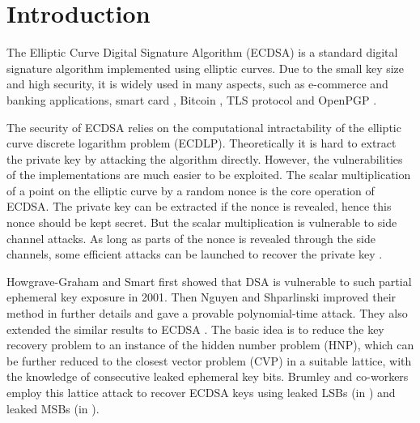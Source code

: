 
\section{Introduction}
\label{sec:intro}
The Elliptic Curve Digital Signature Algorithm (ECDSA) \cite{Johnson2001, ansi2005} is a standard digital signature algorithm implemented using elliptic curves.
Due to the small key size and high security, it is widely used in many aspects, such as e-commerce and banking applications, smart card \cite{smartcard2007}, Bitcoin \cite{bitcoin2008}, TLS protocol \cite{rfc5246} and OpenPGP \cite{openpgp2007}.

The security of ECDSA relies on the computational intractability of the elliptic curve discrete logarithm problem (ECDLP).
Theoretically it is hard to extract the private key by attacking the algorithm directly.
However, the vulnerabilities of the implementations are much easier to be exploited.
The scalar multiplication of a point on the elliptic curve by a random nonce is the core operation of ECDSA.
The private key can be extracted if the nonce is revealed,
hence this nonce should be kept secret.
But the scalar multiplication is vulnerable to side channel attacks.
As long as parts of the nonce is revealed through the side channels,
 some efficient attacks can be launched to recover the private key \cite{Nguyen2001,HG2001,Nguyen2002,Nguyen2003}.

Howgrave-Graham and Smart \cite{HG2001} first showed that DSA is vulnerable to such partial ephemeral key exposure in 2001.
Then Nguyen and Shparlinski \cite{Nguyen2002} improved their method in further details and gave a provable polynomial-time attack.
They also extended the similar results to ECDSA \cite{Nguyen2003}.
The basic idea is to reduce the key recovery problem to an instance of the hidden number problem
(HNP), which can be further reduced to the closest vector problem (CVP) in a suitable lattice, with the
knowledge of consecutive leaked ephemeral key bits.
Brumley and co-workers employ this lattice attack to recover ECDSA keys using leaked LSBs (in \cite{Brumley2009}) and leaked MSBs (in \cite{Brumley2011}).



